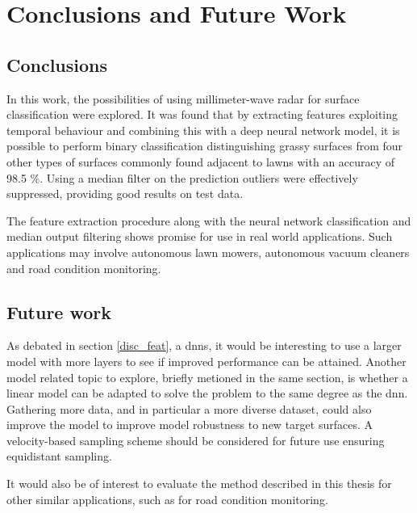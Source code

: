 \chapter{Conclusions and Future Work}

\section{Conclusions}

In this work, the possibilities of using millimeter-wave radar for surface classification were explored. It was found that by extracting features exploiting temporal behaviour and combining this with a deep neural network model, it is possible to perform binary classification distinguishing grassy surfaces from four other types of surfaces commonly found adjacent to lawns with an accuracy of 98.5 \%. Using a median filter on the prediction outliers were effectively suppressed, providing good results on test data. 

The feature extraction procedure along with the neural network classification and median output filtering shows promise for use in real world applications. Such applications may involve autonomous lawn mowers, autonomous vacuum cleaners and road condition monitoring. 



\section{Future work}
As debated in section \ref{disc_feat}, a \gls{dnn}s, it would be interesting to use a larger model with more layers to see if improved performance can be attained. Another model related topic to explore, briefly metioned in the same section, is whether a linear model can be adapted to solve the problem to the same degree as the \gls{dnn}. Gathering more data, and in particular a more diverse dataset, could also improve the model to improve model robustness to new target surfaces. A velocity-based sampling scheme should be considered for future use ensuring equidistant sampling.

It would also be of interest to evaluate the method described in this thesis for other similar applications, such as for road condition monitoring. 


